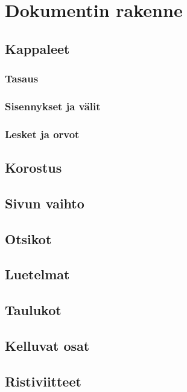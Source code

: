 \chapter{Dokumentin rakenne}
\section{Kappaleet}
\label{luku:kappale}

\subsection{Tasaus}
\subsection{Sisennykset ja välit}
\subsection{Lesket ja orvot}
\section{Korostus}
\section{Sivun vaihto}
\section{Otsikot}


\section{Luetelmat}
\label{luku:luetelmat}
\section{Taulukot}
\label{luku:taulukot}
\section{Kelluvat osat}
\section{Ristiviitteet}
